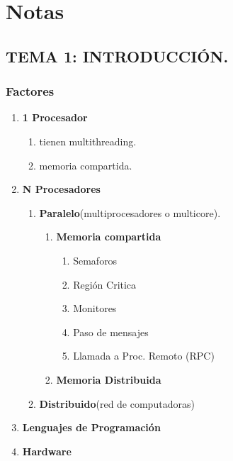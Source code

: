 \documentclass[12pt]{article}
\begin{document}

{\color{blue} \section*{\textbf{Notas}}}
\vspace{1em}

{\color{blue} \subsection*{\textbf{TEMA 1: INTRODUCCIÓN.}}}

\subsubsection*{\textbf{Factores}}
\begin{enumerate}
    \item \textbf{1 Procesador}
    \begin{enumerate}
        \item tienen multithreading.
        \item memoria compartida.
    \end{enumerate}
    \item \textbf{N Procesadores} 
    \begin{enumerate}
        \item \textbf{Paralelo}(multiprocesadores o multicore).
        \begin{enumerate}
            \item \textbf{Memoria compartida}
            \begin{enumerate}
                \item Semaforos
                \item Región Critica
                \item Monitores
                \item Paso de mensajes
                \item Llamada a Proc. Remoto (RPC)
            \end{enumerate}
            \item \textbf{Memoria Distribuida}
        \end{enumerate}
        \item \textbf{Distribuido}(red de computadoras) 
    \end{enumerate}
    \item \textbf{Lenguajes de Programación}
    \item \textbf{Hardware}
\end{enumerate}
\vspace{-0.5em}
\end{document}
